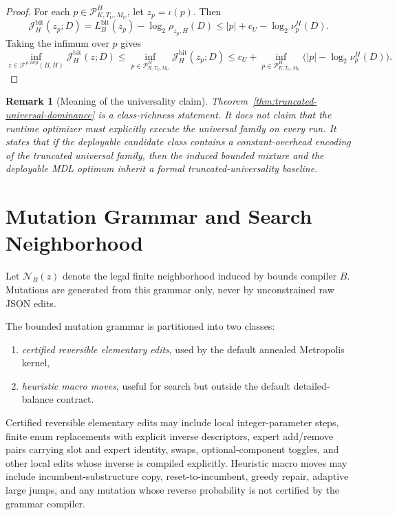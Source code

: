 \documentclass[11pt]{article}
\newtheorem{remark}{Remark}
\begin{document}
\begin{proof}
For each $p\in\mathcal{P}_{K,T_U,M_U}^H$, let $z_p=\iota(p)$. Then
\[
\mathcal{J}_H^{\mathrm{bit}}(z_p;D)
=
L_B^{\mathrm{bit}}(z_p)-\log_2\rho_{z_p,H}(D)
\le
|p|+c_U-\log_2 \nu_p^H(D).
\]
Taking the infimum over $p$ gives
\[
\inf_{z\in\mathcal{F}^{\rho,\mathrm{dep}}(B,H)}\mathcal{J}_H^{\mathrm{bit}}(z;D)
\le
\inf_{p\in\mathcal{P}_{K,T_U,M_U}^H}
\mathcal{J}_H^{\mathrm{bit}}(z_p;D)
\le
c_U
+
\inf_{p\in\mathcal{P}_{K,T_U,M_U}^H}
\bigl(|p|-\log_2 \nu_p^H(D)\bigr).
\]
\end{proof}

\begin{remark}[Meaning of the universality claim]
Theorem~\ref{thm:truncated-universal-dominance} is a class-richness statement.
It does not claim that the runtime optimizer must explicitly execute the
universal family on every run. It states that if the deployable candidate class
contains a constant-overhead encoding of the truncated universal family, then
the induced bounded mixture and the deployable MDL optimum inherit a formal
truncated-universality baseline.
\end{remark}

\section{Mutation Grammar and Search Neighborhood}

Let $\mathcal{N}_B(z)$ denote the legal finite neighborhood induced by bounds compiler $B$.
Mutations are generated from this grammar only, never by unconstrained raw JSON edits.

The bounded mutation grammar is partitioned into two classes:
\begin{enumerate}
    \item \emph{certified reversible elementary edits}, used by the default
    annealed Metropolis kernel,
    \item \emph{heuristic macro moves}, useful for search but outside the
    default detailed-balance contract.
\end{enumerate}
Certified reversible elementary edits may include local integer-parameter
steps, finite enum replacements with explicit inverse descriptors,
expert add/remove pairs carrying slot and expert identity, swaps,
optional-component toggles, and other local edits whose inverse is compiled
explicitly. Heuristic macro moves may include incumbent-substructure copy,
reset-to-incumbent, greedy repair, adaptive large jumps, and any mutation whose
reverse probability is not certified by the grammar compiler.
\end{document}
